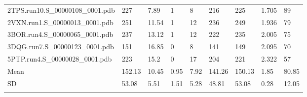 \documentclass{bioinfo}
\begin{document}
\begin{table*}[!t]
{\begin{tabular}{lllllllll}
    2TPS.run10.S\_00000108\_0001.pdb & 227      & 7.89       & 1           & 8           & 216         & 225     & 1.705           & 89           \\
    2VXN.run1.S\_00000013\_0001.pdb & 251      & 11.54      & 1           & 12          & 236         & 249     & 1.936           & 79           \\
    3BOR.run4.S\_00000065\_0001.pdb & 237      & 13.12      & 1           & 12          & 222         & 235     & 2.005           & 75           \\
    3DQG.run7.S\_00000123\_0001.pdb & 151      & 16.85      & 0           & 8           & 141         & 149     & 2.095           & 70           \\
    5PTP.run4.S\_00000028\_0001.pdb & 223      & 15.2       & 0           & 17          & 204         & 221     & 2.322           & 57           \\ \midrule
    Mean                           & 152.13   & 10.45      & 0.95        & 7.92        & 141.26      & 150.13  & 1.85            & 80.85        \\
    SD                             & 53.08    & 5.51       & 1.51        & 5.28        & 48.81       & 53.08   & 0.28            & 12.05        \\ \botrule
\end{tabular}}{}
\end{table*}
\end{document}
